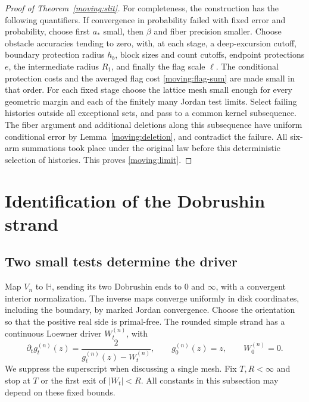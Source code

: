 \begin{proof}[Proof of Theorem~\ref{moving:slit}]
For completeness, the construction has the following quantifiers.
If convergence in probability failed with fixed error and probability,
choose first $a_*$ small, then $\beta$ and fiber precision smaller.
Choose obstacle accuracies tending to zero, with, at each stage,
a deep-excursion cutoff, boundary protection radius $h_b$, block
sizes and count cutoffs, endpoint protections $e$, the intermediate
radius $R_1$, and finally the flag scale $\ell$.  The conditional
protection costs and the averaged flag cost
\eqref{moving:flag-sum} are made small in that order.  For each fixed
stage choose the lattice mesh small enough for every geometric margin
and each of the finitely many Jordan test limits.  Select failing
histories outside all exceptional sets, and pass to a common kernel
subsequence.  The fiber argument and additional deletions along this
subsequence have uniform conditional error by
Lemma~\ref{moving:deletion}, and contradict the failure.  All six-arm
summations took place under the original law before this deterministic
selection of histories.  This proves \eqref{moving:limit}.
\end{proof}

\section{Identification of the Dobrushin strand}\label{sec:chordal}

\subsection{Two small tests determine the driver}

Map $V_n$ to $\mathbb H$, sending its two Dobrushin ends to $0$ and
$\infty$, with a convergent interior normalization.  The inverse maps
converge uniformly in disk coordinates, including the boundary, by
marked Jordan convergence.  Choose the orientation so that the
positive real side is primal-free.  The rounded simple strand has a
continuous Loewner driver $W_t^{(n)}$, with
\begin{equation}\label{chordal:loewner}
 \partial_t g_t^{(n)}(z)=\frac{2}{g_t^{(n)}(z)-W_t^{(n)}},
 \qquad g_0^{(n)}(z)=z,\qquad W_0^{(n)}=0.
\end{equation}
We suppress the superscript when discussing a single mesh.
Fix $T,R<\infty$ and stop at $T$ or the first exit of $|W_t|<R$.
All constants in this subsection may depend on these fixed bounds.

